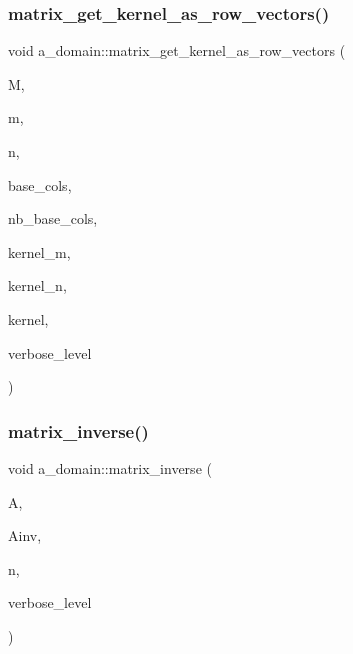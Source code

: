 \subsubsection{\texorpdfstring{matrix\+\_\+get\+\_\+kernel\+\_\+as\+\_\+row\+\_\+vectors()}{matrix\_get\_kernel\_as\_row\_vectors()}}
{\footnotesize\ttfamily void a\+\_\+domain\+::matrix\+\_\+get\+\_\+kernel\+\_\+as\+\_\+row\+\_\+vectors (\begin{DoxyParamCaption}\item[{\mbox{\hyperlink{galois_8h_a09fddde158a3a20bd2dcadb609de11dc}{I\+NT}} $\ast$}]{M,  }\item[{\mbox{\hyperlink{galois_8h_a09fddde158a3a20bd2dcadb609de11dc}{I\+NT}}}]{m,  }\item[{\mbox{\hyperlink{galois_8h_a09fddde158a3a20bd2dcadb609de11dc}{I\+NT}}}]{n,  }\item[{\mbox{\hyperlink{galois_8h_a09fddde158a3a20bd2dcadb609de11dc}{I\+NT}} $\ast$}]{base\+\_\+cols,  }\item[{\mbox{\hyperlink{galois_8h_a09fddde158a3a20bd2dcadb609de11dc}{I\+NT}}}]{nb\+\_\+base\+\_\+cols,  }\item[{\mbox{\hyperlink{galois_8h_a09fddde158a3a20bd2dcadb609de11dc}{I\+NT}} \&}]{kernel\+\_\+m,  }\item[{\mbox{\hyperlink{galois_8h_a09fddde158a3a20bd2dcadb609de11dc}{I\+NT}} \&}]{kernel\+\_\+n,  }\item[{\mbox{\hyperlink{galois_8h_a09fddde158a3a20bd2dcadb609de11dc}{I\+NT}} $\ast$}]{kernel,  }\item[{\mbox{\hyperlink{galois_8h_a09fddde158a3a20bd2dcadb609de11dc}{I\+NT}}}]{verbose\+\_\+level }\end{DoxyParamCaption})}

\mbox{\label{classa__domain_a3746a74f1de058547dd1b55436faada1}} 
\subsubsection{\texorpdfstring{matrix\+\_\+inverse()}{matrix\_inverse()}}
{\footnotesize\ttfamily void a\+\_\+domain\+::matrix\+\_\+inverse (\begin{DoxyParamCaption}\item[{\mbox{\hyperlink{galois_8h_a09fddde158a3a20bd2dcadb609de11dc}{I\+NT}} $\ast$}]{A,  }\item[{\mbox{\hyperlink{galois_8h_a09fddde158a3a20bd2dcadb609de11dc}{I\+NT}} $\ast$}]{Ainv,  }\item[{\mbox{\hyperlink{galois_8h_a09fddde158a3a20bd2dcadb609de11dc}{I\+NT}}}]{n,  }\item[{\mbox{\hyperlink{galois_8h_a09fddde158a3a20bd2dcadb609de11dc}{I\+NT}}}]{verbose\+\_\+level }\end{DoxyParamCaption})}

